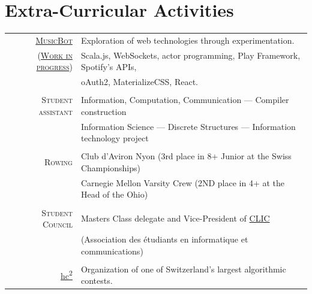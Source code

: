 \documentclass[a4paper,11pt]{article} %
\begin{document}
\section{Extra-Curricular Activities}
\begin{tabular}{rl}

\textsc{\large{\href{https://github.com/paullepoulpe/musicbot}{MusicBot}}} &
Exploration of web technologies through experimentation. \\

\textsc{\large{ (\href{https://musicbot.ch}{Work in progress}) }} &
Scala.js, WebSockets, actor programming, Play Framework, Spotify's APIs, \\
& oAuth2, MaterializeCSS, React.\\
\multicolumn{2}{c}{} \\

\textsc{\large{Student assistant}} &
Information, Computation, Communication ---
Compiler construction\\
& Information Science --- Discrete Structures ---
Information technology project \\
\multicolumn{2}{c}{} \\

\textsc{\large{Rowing}} &
Club d'Aviron Nyon (3rd place in 8+ Junior at the Swiss Championships)\\
& Carnegie Mellon Varsity Crew (2ND place in 4+ at the Head of the Ohio)\\
\multicolumn{2}{c}{} \\

\textsc{\large{Student Council}} &
Masters Class delegate and Vice-President of
\href{http://clic.epfl.ch/}{CLIC}\\
& (Association des étudiants en informatique et communications)\\
\multicolumn{2}{c}{} \\

\large{\href{http://hc2.ch/}{hc\textsuperscript{2}}} & Organization of one of
Switzerland's largest algorithmic contests.\\
\end{tabular}


\end{document}

